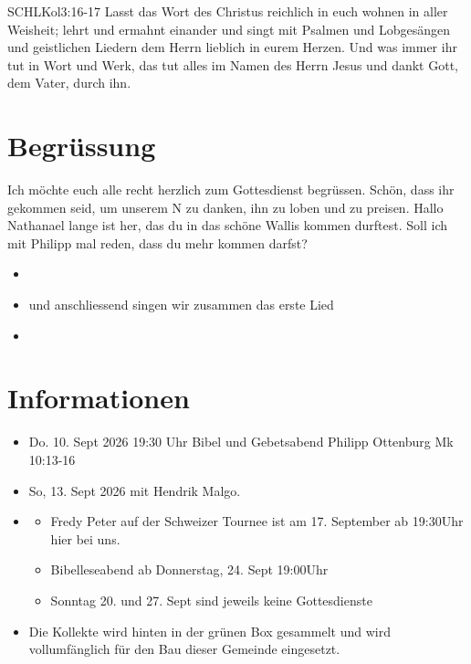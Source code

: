 \documentclass[fontsize=14pt]{mybib}
\author{OTS}
\begin{document}
\begin{bibelbox}{SCHL}{Kol}{3:16-17}
    Lasst das Wort des Christus reichlich in euch wohnen in aller Weisheit; lehrt und ermahnt einander und singt mit Psalmen und Lobgesängen und geistlichen Liedern dem Herrn lieblich in eurem Herzen. Und was immer ihr tut in Wort und Werk, das tut alles im Namen des Herrn Jesus und dankt Gott, dem Vater, durch ihn.
\end{bibelbox}
\section{Begrüssung}
Ich möchte euch alle recht herzlich zum Gottesdienst begrüssen. Schön, dass ihr gekommen seid, um unserem \herr N zu danken, ihn zu loben und zu preisen.
Hallo Nathanael lange ist her, das du in das schöne Wallis kommen durftest. Soll ich mit Philipp mal reden, dass du mehr kommen darfst?

\begin{itemize}
    \item {}
    \item und anschliessend singen wir zusammen das erste Lied
    \item {}
\end{itemize}

\section{Informationen}
\begin{itemize}
    \item {} Do. 10. Sept 2026 19:30 Uhr Bibel und Gebetsabend Philipp Ottenburg Mk 10:13-16\\
    \item {} So, 13. Sept 2026 mit Hendrik Malgo.

    \item {}
          \begin{itemize}
              \item Fredy Peter auf der Schweizer Tournee ist am 17. September ab 19:30Uhr hier bei uns.
              \item Bibelleseabend ab Donnerstag, 24. Sept 19:00Uhr
              \item Sonntag 20. und 27. Sept sind jeweils keine Gottesdienste
          \end{itemize}
    \item {} Die Kollekte wird hinten in der grünen Box gesammelt und wird vollumfänglich für den Bau dieser Gemeinde eingesetzt.
\end{itemize}
\end{document}
